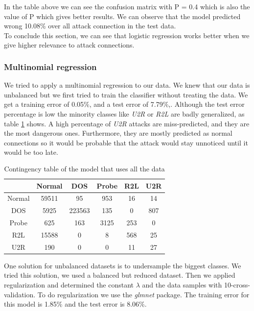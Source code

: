 \documentclass[a4paper]{article} %
\begin{document}
In the table above we can see the confusion matrix with P = 0.4 which is also the value of P which gives better results. We can observe that the model predicted wrong 10.08\% over all attack connection in the test data. \\
To conclude this section, we can see that logistic regression works better when we give higher relevance to attack connections.

\subsubsection{Multinomial regression}
We tried to apply a multinomial regression to our data. We knew that our data is unbalanced but we first tried to train the classifier without treating the data. We get a training error of 0.05\%, and a test error of 7.79\%,. Although the test error percentage is low the minority classes like \textit{U2R} or \textit{R2L} are badly generalized, as table \ref{table:unbModel} shows. A high percentage of \textit{U2R} attacks are miss-predicted, and they are the most dangerous ones. Furthermore, they are mostly predicted as normal connections so it would be probable that the attack would stay unnoticed until it would be too late. 

\begin{table}[H]
	\centering
	\begin{tabular}{c | c c c c c}
		& Normal & DOS & Probe & R2L & U2R \\
		\hline
		Normal	& 59511	& 95 	 & 953	 & 16 	& 14 \\
		DOS		& 5925	& 223563 & 135	 & 0  	& 807\\
		Probe	& 625	& 163	 & 3125	 & 253	& 0 \\
		R2L		& 15588	& 0		 & 8   & 568 	& 25\\
		U2R		& 190	& 0		 & 0    & 11 	& 27\\	
	\end{tabular}
	\caption{Contingency table of the model that uses all the data}
	\label{table:unbModel}
\end{table}


One solution for unbalanced datasets is to undersample the biggest classes. We tried this solution, we used a balanced but reduced dataset. Then we applied regularization and determined the constant $\lambda$ and the data samples with 10-cross-validation. To do regularization we use the \textit{glmnet} package\cite{glmnet}. The training error for this model is 1.85\% and the test error is 8.06\%.
\end{document}

